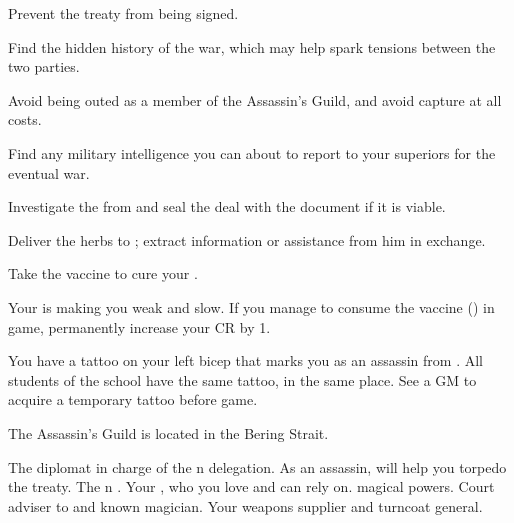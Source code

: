 \documentclass[char]{NeptuneBall}
\begin{document}
\begin{itemz}[Goals]
	\item Prevent the treaty from being signed.
	\item Find the hidden history of the war, which may help spark tensions between the two parties.
	\item Avoid being outed as a member of the Assassin's Guild, and avoid capture at all costs.
  \item Find any military intelligence you can about \pAtlantis{} to report to your superiors for the eventual war.
	\item Investigate the \iPrototype{} from \cGeneral{} and seal the deal with the \iBattlePlan{} document if it is viable.
	\item Deliver the herbs to \cManta{}; extract information or assistance from him in exchange.
	\item Take the vaccine to cure your \pPolio{}.
\end{itemz}

\begin{itemz}[Notes]
  \item Your \pPolio{} is making you weak and slow. If you manage to consume the vaccine (\iVaccine{}) in game, permanently increase your CR by 1.
	\item You have a tattoo on your left bicep that marks you as an assassin from \pAssassin{}. All students of the school have the same tattoo, in the same place. See a GM to acquire a temporary tattoo before game.
\end{itemz}

\begin{itemz}[Trivia]
  \item The Assassin's Guild is located in the Bering Strait.
\end{itemz}

\begin{contacts}
	\contact{\cDiplomat{}} The diplomat in charge of the \pPacifica{}n delegation. As an assassin, \cDiplomat{\they} will help you torpedo the treaty.
	\contact{\cPrince{}} The \pPacifica{}n \cPrince{\Prince}.
  \contact{\cBodyguard{}} Your \cSpy{\sibling}, who you love and can rely on. \cBodyguard{\They} \cBodyguard{\have} magical powers.
	\contact{\cManta{}} Court adviser to \cKing{\King} \cKing{} and known magician.
	\contact{\cGeneral{}} Your weapons supplier and turncoat general.
\end{contacts}
\end{document}
